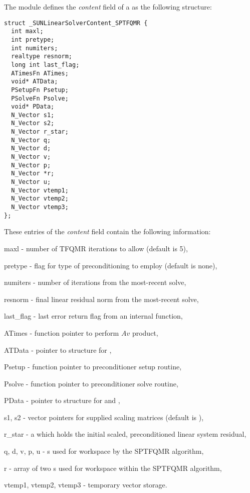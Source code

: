The {\sunlinsolsptfqmr} module defines the \textit{content} field of a
 as the following structure:
\begin{verbatim}
struct _SUNLinearSolverContent_SPTFQMR {
  int maxl;
  int pretype;
  int numiters;
  realtype resnorm;
  long int last_flag;
  ATimesFn ATimes;
  void* ATData;
  PSetupFn Psetup;
  PSolveFn Psolve;
  void* PData;
  N_Vector s1;
  N_Vector s2;
  N_Vector r_star;
  N_Vector q;
  N_Vector d;
  N_Vector v;
  N_Vector p;
  N_Vector *r;
  N_Vector u;
  N_Vector vtemp1;
  N_Vector vtemp2;
  N_Vector vtemp3;
};
\end{verbatim}
These entries of the \emph{content} field contain the following
information:
\begin{args}
  \item[maxl] - number of TFQMR iterations to allow (default is 5),
  \item[pretype] - flag for type of preconditioning to employ
    (default is none),
  \item[numiters] - number of iterations from the most-recent solve,
  \item[resnorm] - final linear residual norm from the most-recent solve,
  \item[last\_flag] - last error return flag from an internal function,
  \item[ATimes] - function pointer to perform $Av$ product,
  \item[ATData] - pointer to structure for ,
  \item[Psetup] - function pointer to preconditioner setup routine,
  \item[Psolve] - function pointer to preconditioner solve routine,
  \item[PData] - pointer to structure for  and ,
  \item[s1, s2] - vector pointers for supplied scaling matrices
    (default is ),
  \item[r\_star] - a {\nvector} which holds the initial scaled,
    preconditioned linear system residual,
  \item[q, d, v, p, u] - {\nvector}s used for workspace by the SPTFQMR
    algorithm,
  \item [r] - array of two {\nvector}s used for workspace within the
    SPTFQMR algorithm,
  \item[vtemp1, vtemp2, vtemp3] - temporary vector storage.
\end{args}

